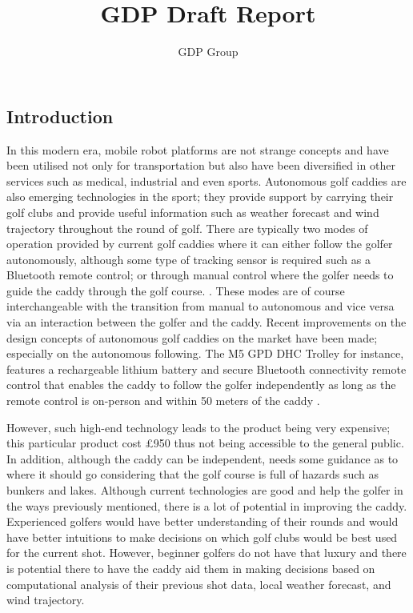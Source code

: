 \documentclass[11pt,landscape]{article}
\title{GDP Draft Report}
\author{GDP Group}
\begin{document}

\newpage
\begin{multicols}{2}
\tableofcontents
\newpage
\section{Introduction}
In this modern era, mobile robot platforms are not strange concepts and have
been utilised not only for transportation but also have been diversified in
other services such as medical, industrial and even sports. Autonomous golf
caddies are also emerging technologies in the sport; they provide support
by carrying their golf clubs and provide useful information such as weather
forecast and wind trajectory throughout the round of golf. There are typically
two modes of operation provided by current golf caddies where it can either
follow the golfer autonomously, although some type of tracking sensor is required
such as a Bluetooth remote control; or through manual control where the
golfer needs to guide the caddy through the golf course.
\cite{choi_2020}. These modes are of course interchangeable with the transition
from manual to autonomous and vice versa via an interaction between the
golfer and the caddy. Recent improvements on the design concepts of autonomous
golf caddies on the market have been made; especially on the autonomous
following. The M5 GPD DHC Trolley for instance, features a rechargeable lithium
battery and secure Bluetooth connectivity remote control that enables the caddy
to follow the golfer independently as long as the remote control is on-person
and within 50 meters of the caddy \cite{golf_2022}.

However, such high-end technology leads to the product being very expensive;
this particular product cost £950 thus not being accessible to the general
public. In addition, although the caddy can be independent, needs some
guidance as to where it should go considering that the golf course is full of
hazards such as bunkers and lakes. Although current technologies are
good and help the golfer in the ways previously mentioned, there is a lot of
potential in improving the caddy. Experienced golfers would have better
understanding of their rounds and would have better intuitions to make decisions
on which golf clubs would be best used for the current shot. However,
beginner golfers do not have that luxury and there is potential there to have
the caddy aid them in making decisions based on computational analysis of their
previous shot data, local weather forecast, and wind trajectory. 


\end{multicols}
\end{document}
